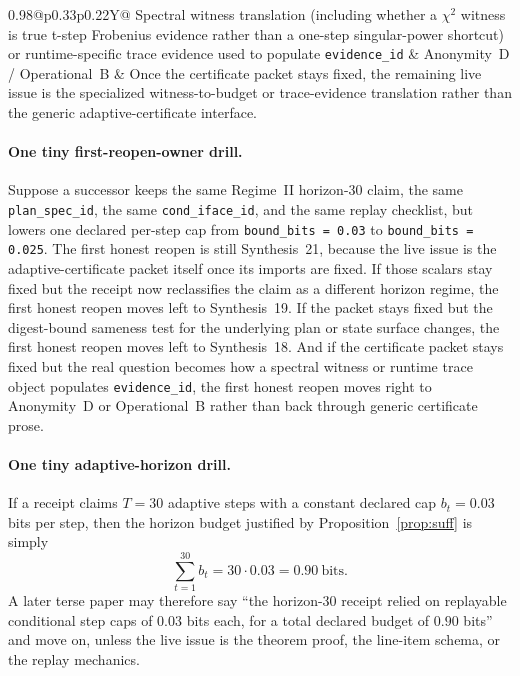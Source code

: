 \documentclass[11pt]{article}
\begin{document}
\begin{table}[t]
\begin{tabularx}{0.98\linewidth}{@{}p{0.33\linewidth}p{0.22\linewidth}Y@{}}
Spectral witness translation (including whether a $\chi^2$ witness is true t-step Frobenius evidence rather than a one-step singular-power shortcut) or runtime-specific trace evidence used to populate \texttt{evidence\_id} & Anonymity~D / Operational~B & Once the certificate packet stays fixed, the remaining live issue is the specialized witness-to-budget or trace-evidence translation rather than the generic adaptive-certificate interface.\\
\bottomrule
\end{tabularx}
\caption{A compact stale-shortcut routing card for adaptive horizon certificates. It names the first already-owned owner that regains authority once a previously cited conditional per-step certificate packet stops being exact.}
\label{tab:first-reopen-condcert}
\end{table}

\paragraph{One tiny first-reopen-owner drill.}
Suppose a successor keeps the same Regime~II horizon-$30$ claim, the same \texttt{plan\_spec\_id}, the same \texttt{cond\_iface\_id}, and the same replay checklist, but lowers one declared per-step cap from \texttt{bound\_bits = 0.03} to \texttt{bound\_bits = 0.025}. The first honest reopen is still Synthesis~21, because the live issue is the adaptive-certificate packet itself once its imports are fixed. If those scalars stay fixed but the receipt now reclassifies the claim as a different horizon regime, the first honest reopen moves left to Synthesis~19. If the packet stays fixed but the digest-bound sameness test for the underlying plan or state surface changes, the first honest reopen moves left to Synthesis~18. And if the certificate packet stays fixed but the real question becomes how a spectral witness or runtime trace object populates \texttt{evidence\_id}, the first honest reopen moves right to Anonymity~D or Operational~B rather than back through generic certificate prose.\cite{series:oddsinflation,series:receiptitems,series:planstateequiv,series:accountingrulebook,series:auditorreplay,series:spectral2budget,series:operationalB}

\paragraph{One tiny adaptive-horizon drill.}
If a receipt claims $T=30$ adaptive steps with a constant declared cap $b_t=0.03$ bits per step, then the horizon budget justified by Proposition~\ref{prop:suff} is simply
\[
\sum_{t=1}^{30} b_t = 30\cdot 0.03 = 0.90\ \text{bits}.
\]
A later terse paper may therefore say ``the horizon-30 receipt relied on replayable conditional step caps of $0.03$ bits each, for a total declared budget of $0.90$ bits'' and move on, unless the live issue is the theorem proof, the line-item schema, or the replay mechanics.
\end{document}
